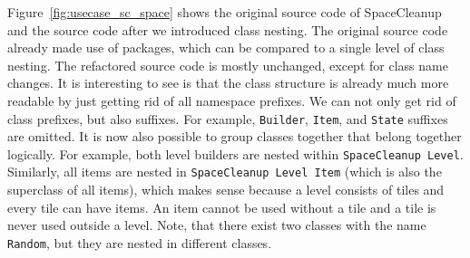 Figure~\ref{fig:usecase_sc_space} shows the original source code of SpaceCleanup and the source code after we introduced class nesting. The original source code already made use of packages, which can be compared to a single level of class nesting. The refactored source code is mostly unchanged, except for class name changes. It is interesting to see is that the class structure is already much more readable by just getting rid of all namespace prefixes. We can not only get rid of class prefixes, but also suffixes. For example, \texttt{Builder}, \texttt{Item}, and \texttt{State} suffixes are omitted. It is now also possible to group classes together that belong together logically. For example, both level builders are nested within \texttt{SpaceCleanup Level}. Similarly, all items are nested in \texttt{SpaceCleanup Level Item} (which is also the superclass of all items), which makes sense because a level consists of tiles and every tile can have items. An item cannot be used without a tile and a tile is never used outside a level. Note, that there exist two classes with the name \texttt{Random}, but they are nested in different classes.

